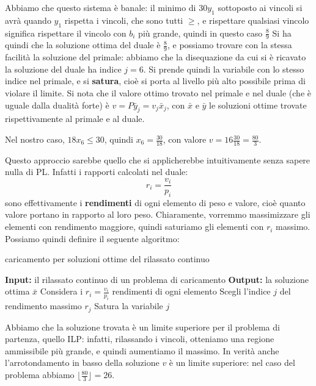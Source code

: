\documentclass[a4paper,11pt]{article}
\begin{document}
Abbiamo che questo sistema è banale: il minimo di $30 y_1$ sottoposto ai vincoli si avrà quando $y_1$ rispetta i vincoli, che sono tutti $\geq$, e rispettare qualsiasi vincolo significa rispettare il vincolo con $b_i$ più grande, quindi in questo caso $\frac{8}{9}$
Si ha quindi che la soluzione ottima del duale è $\frac{8}{9}$, e possiamo trovare con la stessa facilità la soluzione del primale: abbiamo che la disequazione da cui si è ricavato la soluzione del duale ha indice $j = 6$.
Si prende quindi la variabile con lo stesso indice nel primale, e si \textbf{satura}, cioè si porta al livello più alto possibile prima di violare il limite.
Si nota che il valore ottimo trovato nel primale e nel duale (che è uguale dalla dualità forte) è $v = P \bar{y}_j = v_j \bar{x}_j $, con $\bar{x}$ e $\bar{y}$ le soluzioni ottime trovate rispettivamente al primale e al duale. 

Nel nostro caso, $18 x_6 \leq 30$, quindi $x_6 = \frac{30}{18}$, con valore $v = 16 \frac{30}{18} = \frac{80}{3}$.

Questo approccio sarebbe quello che si applicherebbe intuitivamente senza sapere nulla di PL. 
Infatti i rapporti calcolati nel duale:
$$
r_i = \frac{v_i}{p_i}
$$
sono effettivamente i \textbf{rendimenti} di ogni elemento di peso e valore, cioè quanto valore portano in rapporto al loro peso.
Chiaramente, vorremmo massimizzare gli elementi con rendimento maggiore, quindi saturiamo gli elementi con $r_i$ massimo.
Possiamo quindi definire il seguente algoritmo:

\begin{algorithm}[H]
\caption{caricamento per soluzioni ottime del rilassato continuo}
\begin{algorithmic}
	\STATE \textbf{Input:} il rilassato continuo di un problema di caricamento
	\STATE \textbf{Output:} la soluzione ottima $\bar{x}$
	\STATE Considera i $r_i = \frac{v_i}{p_i}$ rendimenti di ogni elemento
	\STATE Scegli l'indice $j$ del rendimento massimo $r_j$
	\STATE Satura la variabile $j$
\end{algorithmic}
\end{algorithm}

Abbiamo che la soluzione trovata è un limite superiore per il problema di partenza, quello ILP: infatti, rilassando i vincoli, otteniamo una regione ammissibile più grande, e quindi aumentiamo il massimo.
In verità anche l'arrotondamento in basso della soluzione $v$ è un limite superiore: nel caso del problema abbiamo $ \lfloor \frac{80}{3} \rfloor = 26$.
\end{document}
